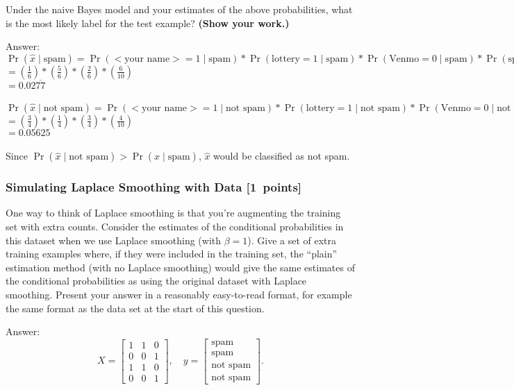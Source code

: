 \documentclass{article}
\newcommand{\blu}[1]{{\textcolor{blu}{#1}}}
\newenvironment{answer}{\par\begingroup\color{gre}Answer: }{\endgroup}
\let\ask\blu
\newcommand\pts[1]{\textcolor{pointscolour}{[#1~points]}}
\begin{document}
    \ask{Under the naive Bayes model and your estimates of the above probabilities, what is the most likely label for the test example? \textbf{(Show your work.)}}
    \begin{answer}\\
    $\Pr(\hat{x} \mid \text{spam}) = \Pr(\text{$<$your name$>$} = 1 \mid \text{spam}) * \Pr(\text{lottery} = 1 \mid \text{spam}) * \Pr(\text{Venmo} = 0 \mid \text{spam}) * \Pr(\text{spam})$ \\
    $= (\frac{1}{6}) * (\frac{5}{6}) * (\frac{2}{6}) * (\frac{6}{10})$ \\
    $= 0.02\overline{77}$ \\ \\
    $\Pr(\hat{x} \mid \text{not spam}) = \Pr(\text{$<$your name$>$} = 1 \mid \text{not spam}) * \Pr(\text{lottery} = 1 \mid \text{not spam}) * \Pr(\text{Venmo} = 0 \mid \text{not spam}) * \Pr(\text{not spam})$ \\
    $= (\frac{3}{4}) * (\frac{1}{4}) * (\frac{3}{4}) * (\frac{4}{10})$ \\
    $= 0.05625$ \\ \\
    Since $\Pr(\hat{x} \mid \text{not spam}) > \Pr(\hat{x} \mid \text{spam})$, $\hat{x}$ would be classified as not spam.
    \end{answer}
    \subsubsection{Simulating Laplace Smoothing with Data \pts{1}}
    \label{laplace.conceptual}

    One way to think of Laplace smoothing is that you're augmenting the training set with extra counts. Consider the estimates of the conditional probabilities in this dataset when we use Laplace smoothing (with $\beta = 1$).
    \ask{Give a set of extra training examples where, if they were included in the training set, the ``plain'' estimation method (with no Laplace smoothing) would give the same estimates of the conditional probabilities as using the original dataset with Laplace smoothing.}
    Present your answer in a reasonably easy-to-read format, for example the same format as the data set at the start of this question.
    \begin{answer}
    \[
    X = \begin{bmatrix}
        1 & 1 & 0\\
        0 & 0 & 1\\
        1 & 1 & 0\\
        0 & 0 & 1
    \end{bmatrix},
    \quad y = \begin{bmatrix}
        \text{spam}\\
        \text{spam}\\
        \text{not spam}\\
        \text{not spam}
    \end{bmatrix}.
    \]
    \end{answer}
\end{document}
